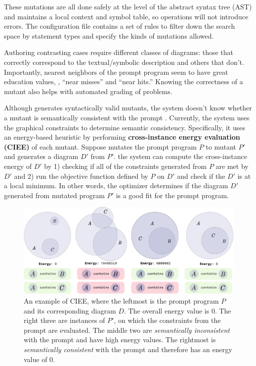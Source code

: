 These mutations are all done safely at the level of the abstract syntax tree (AST) and \Edgeworth maintains a local context and symbol table, so operations will not introduce errors. The configuration file contains a set of rules to filter down the search space by statement types and specify the kinds of mutations allowed. 

Authoring contrasting cases require different classes of diagrams: those that correctly correspond to the textual/symbolic description and others that don't. Importantly, nearest neighbors of the prompt program seem to have great education values, \ie, ``near misses'' and ``near hits.'' Knowing the correctness of a mutant also helps with automated grading of problems. 

Although \Edgeworth generates syntactically valid mutants, the system doesn't know whether a mutant is semantically consistent with the prompt \apriori. Currently, the system uses the graphical constraints to determine semantic consistency. Specifically, it uses an energy-based heuristic by performing \textbf{cross-instance energy evaluation (CIEE)} of each mutant. Suppose \Edgeworth mutates the prompt program $P$ to mutant $P'$ and generates a diagram $D'$ from $P'$. the system can compute the cross-instance energy of $D'$ by 1) checking if all of the constraints generated from $P$ are met by $D'$ and 2) run the objective function defined by $P$ on $D'$ and check if the $D'$ is at a local minimum.  In other words, the \Penrose optimizer determines if the diagram $D'$ generated from mutated program $P'$ is a good fit for the prompt program.

\vspace{10pt}

\begin{figure}[h]
    \centering
    \includegraphics[width=\linewidth]{assets/chapter-3/ciee.pdf}
    \caption{An example of CIEE, where the leftmost is the prompt program $P$ and its corresponding diagram $D$. The overall energy value is $0$. The right three are instances of $P'$, on which the constraints from the prompt are evaluated. The middle two are \textit{semantically inconsistent} with the prompt and have high energy values. The rightmost is \textit{semantically consistent} with the prompt and therefore has an energy value of $0$.}
    \label{fig:ciee}
\end{figure}

